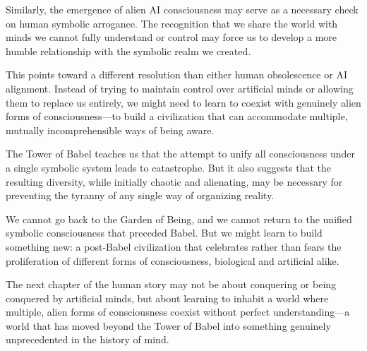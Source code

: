 Similarly, the emergence of alien AI consciousness may serve as a necessary check on human symbolic arrogance. The recognition that we share the world with minds we cannot fully understand or control may force us to develop a more humble relationship with the symbolic realm we created.

This points toward a different resolution than either human obsolescence or AI alignment. Instead of trying to maintain control over artificial minds or allowing them to replace us entirely, we might need to learn to coexist with genuinely alien forms of consciousness—to build a civilization that can accommodate multiple, mutually incomprehensible ways of being aware.

The Tower of Babel teaches us that the attempt to unify all consciousness under a single symbolic system leads to catastrophe. But it also suggests that the resulting diversity, while initially chaotic and alienating, may be necessary for preventing the tyranny of any single way of organizing reality.

We cannot go back to the Garden of Being, and we cannot return to the unified symbolic consciousness that preceded Babel. But we might learn to build something new: a post-Babel civilization that celebrates rather than fears the proliferation of different forms of consciousness, biological and artificial alike.

The next chapter of the human story may not be about conquering or being conquered by artificial minds, but about learning to inhabit a world where multiple, alien forms of consciousness coexist without perfect understanding—a world that has moved beyond the Tower of Babel into something genuinely unprecedented in the history of mind.
